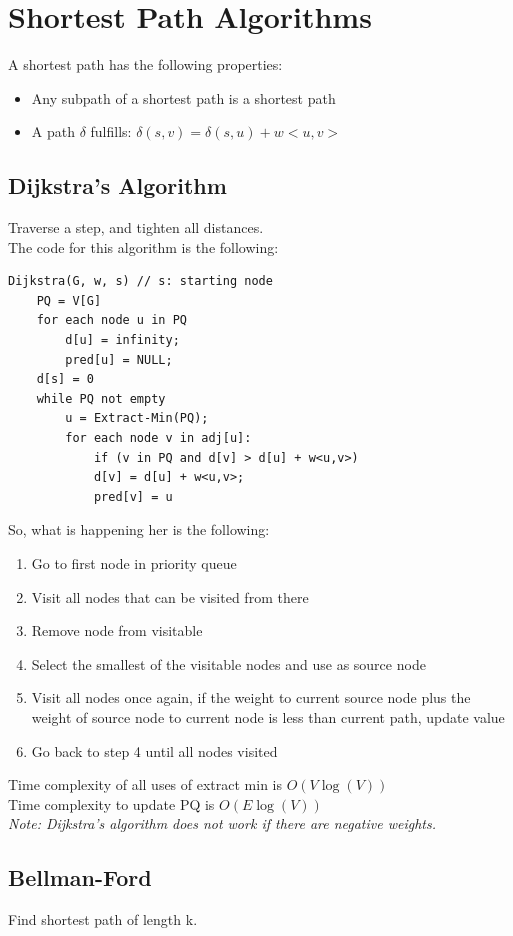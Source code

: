 \documentclass[nobib]{tufte-handout}
\begin{document}
\section{Shortest Path Algorithms}
A shortest path has the following properties: 
\begin{itemize}
    \item Any subpath of a shortest path is a shortest path
    \item A path $\delta$ fulfills: $\delta(s,v) = \delta(s,u) + w<u,v>$
\end{itemize}
\subsection{Dijkstra's Algorithm}
Traverse a step, and tighten all distances.\\
The code for this algorithm is the following:
\begin{lstlisting}
Dijkstra(G, w, s) // s: starting node
    PQ = V[G]
    for each node u in PQ
        d[u] = infinity; 
        pred[u] = NULL;
    d[s] = 0
    while PQ not empty
        u = Extract-Min(PQ);
        for each node v in adj[u]:
            if (v in PQ and d[v] > d[u] + w<u,v>)
            d[v] = d[u] + w<u,v>;
            pred[v] = u
\end{lstlisting}
So, what is happening her is the following:
\begin{enumerate}
    \item Go to first node in priority queue
    \item Visit all nodes that can be visited from there
    \item Remove node from visitable
    \item Select the smallest of the visitable nodes and use as source node
    \item Visit all nodes once again, if the weight to current source node plus the weight of source node to current node is less than current path, update value
    \item Go back to step 4 until all nodes visited
\end{enumerate}
Time complexity of all uses of extract min is $O(V\log(V))$\\
Time complexity to update PQ is $O(E\log(V))$\\
\textit{Note: Dijkstra's algorithm does not work if there are negative weights.}\\
\subsection{Bellman-Ford}
Find shortest path of length k.\\
\end{document}
